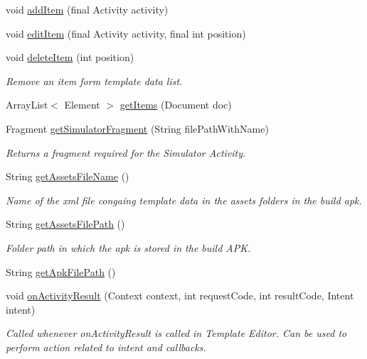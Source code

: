 \begin{DoxyCompactItemize}
void \hyperlink{classorg_1_1buildmlearn_1_1toolkit_1_1templates_1_1QuizTemplate_af16912a1df8554f8131d706f5ed491d9}{add\-Item} (final Activity activity)
\item 
void \hyperlink{classorg_1_1buildmlearn_1_1toolkit_1_1templates_1_1QuizTemplate_a061e888a27db66b5b9d408a1067d4eac}{edit\-Item} (final Activity activity, final int position)
\item 
void \hyperlink{classorg_1_1buildmlearn_1_1toolkit_1_1templates_1_1QuizTemplate_a71f43dadf52d381b71b0b8d4ce9d52a1}{delete\-Item} (int position)
\begin{DoxyCompactList}\small\item\em Remove an item form template data list. \end{DoxyCompactList}\item 
Array\-List$<$ Element $>$ \hyperlink{classorg_1_1buildmlearn_1_1toolkit_1_1templates_1_1QuizTemplate_a3d41a179fe1b10edd828d4ef4f0fb344}{get\-Items} (Document doc)
\item 
Fragment \hyperlink{classorg_1_1buildmlearn_1_1toolkit_1_1templates_1_1QuizTemplate_acef98cb485fc56abca5f6ecff6fe28c1}{get\-Simulator\-Fragment} (String file\-Path\-With\-Name)
\begin{DoxyCompactList}\small\item\em Returns a fragment required for the Simulator Activity. \end{DoxyCompactList}\item 
String \hyperlink{classorg_1_1buildmlearn_1_1toolkit_1_1templates_1_1QuizTemplate_a76c88931863b00d9713007e729431e23}{get\-Assets\-File\-Name} ()
\begin{DoxyCompactList}\small\item\em Name of the xml file congaing template data in the assets folders in the build apk. \end{DoxyCompactList}\item 
String \hyperlink{classorg_1_1buildmlearn_1_1toolkit_1_1templates_1_1QuizTemplate_a7f0008da11aa1e2608a82214c92809e3}{get\-Assets\-File\-Path} ()
\begin{DoxyCompactList}\small\item\em Folder path in which the apk is stored in the build A\-P\-K. \end{DoxyCompactList}\item 
String \hyperlink{classorg_1_1buildmlearn_1_1toolkit_1_1templates_1_1QuizTemplate_afe64be10f6c439dd611e843ceabb5ac4}{get\-Apk\-File\-Path} ()
\item 
void \hyperlink{classorg_1_1buildmlearn_1_1toolkit_1_1templates_1_1QuizTemplate_a23bf444a6527a4be8b416f1d04a4912e}{on\-Activity\-Result} (Context context, int request\-Code, int result\-Code, Intent intent)
\begin{DoxyCompactList}\small\item\em Called whenever on\-Activity\-Result is called in Template Editor. Can be used to perform action related to intent and callbacks. \end{DoxyCompactList}\end{DoxyCompactItemize}


